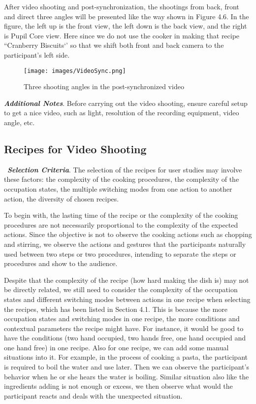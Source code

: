\documentclass[fyp]{socreport}
\begin{document}
After video shooting and post-synchronization, the shootings from back, front and direct three angles will be presented like the way shown in Figure 4.6. In the figure, the left up is the front view, the left down is the back view, and the right is Pupil Core view. Here since we do not use the cooker in making that recipe ``Cranberry Biscuits‘’ so that we shift both front and back camera to the participant's left side.

\begin{figure}[H]
\caption{Three shooting angles in the post-synchronized video}
\centering
\texttt{[image: images/VideoSync.png]}
\end{figure}

\textbf{\textit{Additional Notes}}. Before carrying out the video shooting, ensure careful setup to get a nice video, such as light, resolution of the recording equipment, video angle, etc.

\subsection{Recipes for Video Shooting}
\quad\, \textbf{\textit{Selection Criteria}}. The selection of the recipes for user studies may involve these factors: the complexity of the cooking procedures, the complexity of the occupation states, the multiple switching modes from one action to another action, the diversity of chosen recipes.

To begin with, the lasting time of the recipe or the complexity of the cooking procedures are not necessarily proportional to the complexity of the expected actions. Since the objective is not to observe the cooking actions such as chopping and stirring, we observe the actions and gestures that the participants naturally used between two steps or two procedures, intending to separate the steps or procedures and show to the audience.

Despite that the complexity of the recipe (how hard making the dish is) may not be directly related, we still need to consider the complexity of the occupation states and different switching modes between actions in one recipe when selecting the recipes, which has been listed in Section 4.1. This is because the more occupation states and switching modes in one recipe, the more conditions and contextual parameters the recipe might have. For instance, it would be good to have the conditions (two hand occupied, two hands free, one hand occupied and one hand free) in one recipe. Also for one recipe, we can add some manual situations into it. For example, in the process of cooking a pasta, the participant is required to boil the water and use later. Then we can observe the participant's behavior when he or she hears the water is boiling. Similar situation also like the ingredients adding is not enough or excess, we then observe what would the participant reacts and deals with the unexpected situation.
\end{document}
